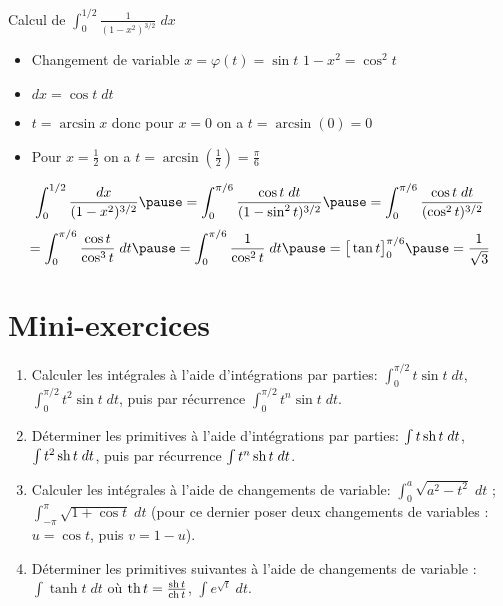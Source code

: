 \begin{frame}
\begin{exemple}
\hfil\hfil Calcul de $\displaystyle \int_0^{1/2}\frac{1}{(1-x^2)^{3/2}} \;dx$

\pause

\begin{itemize}
  \item Changement de variable $x=\varphi(t) = \sin t$ \pause \quad $1-x^2=\cos^2t$
\pause
  \item $dx = \cos t \; dt$
\pause
  \item $t=\arcsin x$ donc pour $x=0$ on a $t=\arcsin(0)=0$
\pause
  \item Pour $x=\frac12$ on a $t=\arcsin(\frac12)=\frac\pi6$
\end{itemize}

\pause

\[
\int_0^{1/2} \frac{dx}{(1-x^2)^{3/2}}
\pause
= \int_0^{\pi/6}\frac{\cos t \; dt}{(1-\sin^2 t)^{3/2}}
\pause
= \int_0^{\pi/6}\frac{\cos t \; dt}{(\cos^2 t)^{3/2}} 
\]
\pause
\[
= \int_0^{\pi/6}\frac{\cos t}{\cos^3 t} \;dt 
\pause
=  \int_0^{\pi/6}\frac{1}{\cos^2 t} \;dt 
\pause
= \big[\tan t\big]_0^{\pi/6}
\pause
=\frac{1}{\sqrt{3}} 
\]
\end{exemple}
\end{frame}






\section*{Mini-exercices}


\begin{frame}
\begin{miniexercice}
\begin{enumerate}
  \item Calculer les intégrales à l'aide d'intégrations par parties: 
  $\int_0^{\pi/2} t \sin t \; dt$, $\int_0^{\pi/2} t^2 \sin t \; dt$, puis par récurrence
  $\int_0^{\pi/2} t^n \sin t \; dt$.

  \item Déterminer les primitives à l'aide d'intégrations par parties:
  $\int t \mathop{\text{sh}}\nolimits t \; dt$, $\int t^2 \mathop{\text{sh}}\nolimits t \; dt$, puis par récurrence
  $\int t^n \mathop{\text{sh}}\nolimits t \; dt$.

  \item Calculer les intégrales à l'aide de changements de variable:
  $\int_0^a \sqrt{a^2 - t^2} \; dt$ ;
  $\int_{-\pi}^\pi \sqrt{1+\cos t} \; dt$ (pour ce dernier poser deux changements de variables : 
  $u = \cos t$, puis $v=1-u$). 

  \item Déterminer les primitives suivantes à l'aide de changements de variable :
  $\int \tanh t \; dt$ où $\mathop{\text{th}}\nolimits t = \frac{\mathop{\text{sh}}\nolimits t}{\mathop{\text{ch}}\nolimits t}$,
  $\int e^{\sqrt{t}} \; dt$.
\end{enumerate}
\end{miniexercice}
\end{frame}



